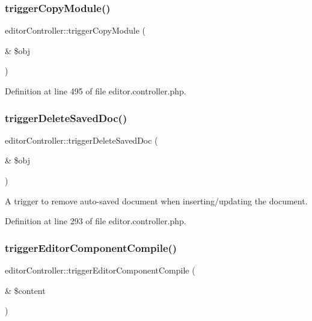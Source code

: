 \subsubsection{\texorpdfstring{trigger\+Copy\+Module()}{triggerCopyModule()}}
{\footnotesize\ttfamily editor\+Controller\+::trigger\+Copy\+Module (\begin{DoxyParamCaption}\item[{\&}]{\$obj }\end{DoxyParamCaption})}



Definition at line 495 of file editor.\+controller.\+php.

\hypertarget{classeditorController_a9a141433e80917efe9280dc8eb4fe5c2}{}\label{classeditorController_a9a141433e80917efe9280dc8eb4fe5c2} 
\subsubsection{\texorpdfstring{trigger\+Delete\+Saved\+Doc()}{triggerDeleteSavedDoc()}}
{\footnotesize\ttfamily editor\+Controller\+::trigger\+Delete\+Saved\+Doc (\begin{DoxyParamCaption}\item[{\&}]{\$obj }\end{DoxyParamCaption})}



A trigger to remove auto-\/saved document when inserting/updating the document. 



Definition at line 293 of file editor.\+controller.\+php.

\hypertarget{classeditorController_a6003487c398eae0676e15f5437cebdf8}{}\label{classeditorController_a6003487c398eae0676e15f5437cebdf8} 
\subsubsection{\texorpdfstring{trigger\+Editor\+Component\+Compile()}{triggerEditorComponentCompile()}}
{\footnotesize\ttfamily editor\+Controller\+::trigger\+Editor\+Component\+Compile (\begin{DoxyParamCaption}\item[{\&}]{\$content }\end{DoxyParamCaption})}



